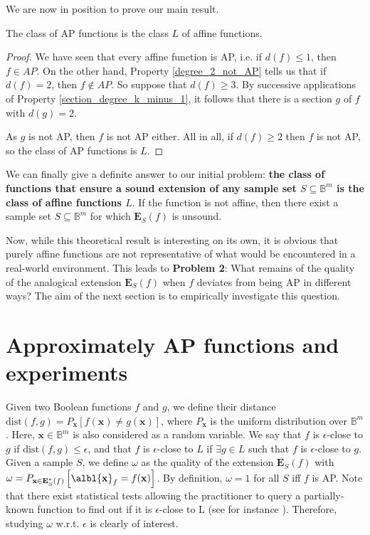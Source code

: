 \documentclass[article]{amsart}
\begin{document}
We are now in position to prove our main result.

\begin{propos}\label{AP_is_L}
The class of AP functions is the class $L$ of affine functions.
\end{propos}
\begin{proof}
We have seen that every affine function is AP, i.e. if $d(f)\leq 1$, then $f\in
  AP$. On the other hand, Property \ref{degree_2_not_AP} tells us that if
  $d(f)=2$, then $f \notin AP$. So suppose that  $d(f)\geq 3$. By successive
  applications of Property \ref{section_degree_k_minus_1}, it follows that
  there is a section $g$ of $f$ with $d(g)=2$.

  As $g$ is not AP, then $f$ is not AP either. All in all, if $d(f) \geq 2$
  then $f$ is not AP, so the class of AP functions is $L$.
\end{proof}

We can finally give a definite answer to our initial problem: {\bf the class of
functions that ensure a sound extension of any sample set $S \subseteq
\mathbb{B}^m$ is the class of affine functions $L$}. If the function is not
affine, then there exist a sample set $S \subseteq \mathbb{B}^m$ for which
$\mathbf{E}_S(f)$ is unsound.

Now, while this theoretical result is interesting on its own, it is obvious
that purely affine functions are not representative of what would be
encountered in a real-world environment.  This leads to {\bf Problem 2}: What
remains of the quality of the analogical extension $\mathbf{E}_S(f)$ when $f$
deviates from being AP in different ways?  The aim of the next section is to
empirically investigate this question.

\section{Approximately AP functions and experiments}
\label{approximate_ap_functions}

Given two Boolean functions $f$ and $g$, we define their distance
$\text{dist}(f, g) = P_\mathbf{x}\left[f(\mathbf{x}) \neq
g(\mathbf{x})\right]$, where $P_\mathbf{x}$ is the uniform distribution over
$\mathbb{B}^m$. Here, $\mathbf{x} \in \mathbb{B}^m$ is also considered as a
random variable. We say that $f$ is $\epsilon$-close to $g$ if $\text{dist}(f,
g) \leq \epsilon$, and that $f$ is $\epsilon$-close to $L$ if $\exists g \in L$
such that $f$ is $\epsilon$-close to $g$. Given a sample $S$, we define
$\omega$ as the quality of the extension $\mathbf{E}_S(f)$ with $\omega =
P_{\mathbf{x}\in \mathbf{E}^*_S(f)}\left[\albl{\mathbf{x}}_f =
f(\mathbf{x})\right]$. By definition, $\omega=1$ for all $S$ iff $f$ is AP.
Note that there exist statistical tests allowing the practitioner to query a
partially-known function to find out if it is $\epsilon$-close to L (see for
instance \cite{BluLubRub1993}). Therefore, studying $\omega$ w.r.t. $\epsilon$
is clearly of interest.
\end{document}
